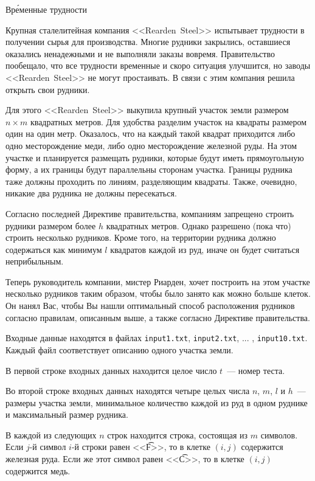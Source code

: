 \begin{problem}{Вр\'{е}менные трудности}{}{}{}{}

Крупная сталелитейная компания <<Rearden~Steel>> испытывает трудности в получении сырья для производства. Многие рудники закрылись, оставшиеся оказались ненадежными и не выполняли заказы вовремя. Правительство пообещало, что все трудности временные и скоро ситуация улучшится, но заводы <<Rearden~Steel>> не могут простаивать. В связи с этим компания решила открыть свои рудники.

Для этого <<Rearden~Steel>> выкупила крупный участок земли размером $n\times m$ квадратных метров. Для удобства разделим участок на квадраты размером один на один метр. Оказалось, что на каждый такой квадрат приходится либо одно месторождение меди, либо одно месторождение железной руды. На этом участке и планируется размещать рудники, которые будут иметь прямоугольную форму, а их границы будут параллельны сторонам участка. Границы рудника таже должны проходить по линиям, разделяющим квадраты. Также, очевидно, никакие два рудника не должны пересекаться.

Согласно последней Директиве правительства, компаниям запрещено строить рудники размером более $h$ квадратных метров. Однако разрешено (пока что) строить несколько рудников. Кроме того, на территории рудника должно содержаться как минимум $l$ квадратов каждой из руд, иначе он будет считаться неприбыльным.

Теперь руководитель компании, мистер Риарден, хочет построить на этом участке несколько рудников таким образом, чтобы было занято как можно больше клеток. Он нанял Вас, чтобы Вы нашли оптимальный способ расположения рудников согласно правилам, описанным выше, а также согласно Директиве правительства.

\InputFile

Входные данные находятся в файлах \texttt{input1.txt}, \texttt{input2.txt}, ... , \texttt{input10.txt}. Каждый файл соответствует описанию одного участка земли.

В первой строке входных данных находится целое число $t$~--- номер теста.

Во второй строке входных данных находятся четыре целых числа $n$, $m$, $l$ и $h$~--- размеры участка земли, минимальное количество каждой из руд в одном руднике и максимальный размер рудника.

В каждой из следующих $n$ строк находится строка, состоящая из $m$ символов. Если $j$-й символ $i$-й строки равен <<\t{F}>>, то в клетке $(i, j)$ содержится железная руда. Если же этот символ равен <<\t{C}>>, то в клетке $(i, j)$ содержится медь.


\end{problem}

